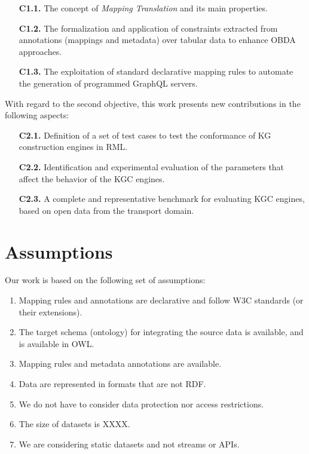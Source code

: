 \begin{enumerate}
    \item[\textbf{C1.1.}] The concept of \textit{Mapping Translation} and its main properties. 
    \item[\textbf{C1.2.}] The formalization and application of constraints extracted from annotations (mappings and metadata) over tabular data to enhance OBDA approaches. 
    \item[\textbf{C1.3.}] The exploitation of standard declarative mapping rules to automate the generation of programmed GraphQL servers. 
\end{enumerate}

With regard to the second objective, this work presents new contributions in the following aspects:
\begin{enumerate}
    \item[\textbf{C2.1.}] Definition of a set of test cases to test the conformance of KG construction engines in RML.
    \item[\textbf{C2.2.}] Identification and experimental evaluation of the parameters that affect the behavior of the KGC engines. 
    \item[\textbf{C2.3.}] A complete and representative benchmark for evaluating KGC engines, based on open data from the transport domain.
\end{enumerate}

\section{Assumptions}
Our work is based on the following set of assumptions:
\begin{enumerate}[label=\textbf{A{\arabic*}}]
    \item Mapping rules and annotations are declarative and follow W3C standards (or their extensions). 
    \item The target schema (ontology) for integrating the source data is available, and is available in OWL.
    \item Mapping rules and metadata annotations are available.
    \item Data are represented in formats that are not RDF.
    \item We do not have to consider data protection nor access restrictions.
    \item The size of datasets is XXXX.
    \item We are considering static datasets and not streams or APIs.
\end{enumerate}

